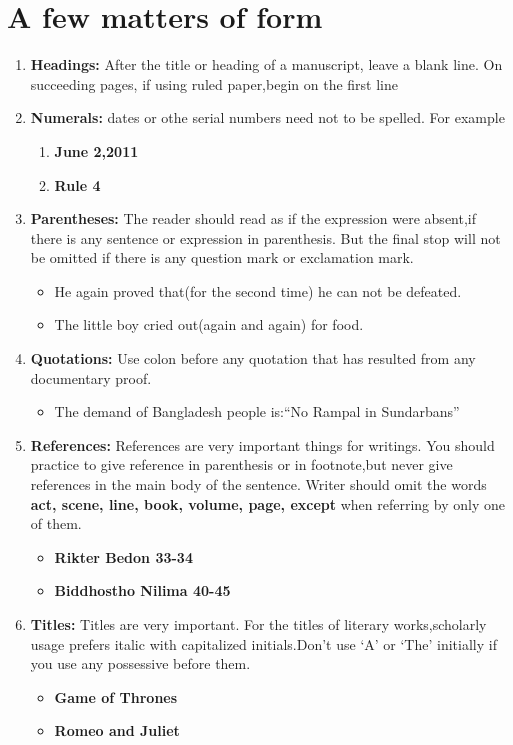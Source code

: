 \documentclass{report}
\begin{document}
\chapter{\color{blue}A few matters of form}
\label{chap4}
\begin{enumerate}
	\item \textbf{Headings:}
	After the title or heading of a manuscript, leave a blank line. On succeeding
	pages, if using ruled paper,begin on the first line
	\item \textbf{Numerals:}
	dates or othe serial numbers need not to be spelled. For example
	\begin{enumerate}
		\item \textbf{June 2,2011}
		\item \textbf{Rule 4}
	\end{enumerate}
	\item \textbf{Parentheses:}
	The reader should read as if the expression were absent,if there is any sentence
	or expression in parenthesis. But the final stop will not be omitted if there is
	any question mark or exclamation mark.
	\begin{itemize}
		\item He again proved that(for the second time) he can not be defeated.
		\item The little boy cried out(again and again) for food.
	\end{itemize}
	\item \textbf{Quotations:}
	Use colon before any quotation that has resulted from any documentary proof.
	\begin{itemize}
		\item The demand of Bangladesh people is:“No Rampal in Sundarbans”
	\end{itemize}
	
	\item \textbf{References:}
	References are very important things for writings. You should practice to give reference in parenthesis or in footnote,but never give references in the main body of the sentence. Writer should omit the words \textbf{act, scene, line, book, volume, page, except} when referring by only one of them.
	
	\begin{itemize}
		\item \textbf{Rikter Bedon 33-34}
		\item \textbf{Biddhostho Nilima 40-45}
	\end{itemize}
	
	\item \textbf{Titles:}
	Titles are very important. For the titles of literary works,scholarly usage prefers italic with capitalized initials.Don’t use ‘A’ or ‘The’ initially if you use any possessive before them.
		\begin{itemize}
		\item \textbf{Game of Thrones}
		\item \textbf{Romeo and Juliet}
	\end{itemize}
	
\end{enumerate}
\end{document}
